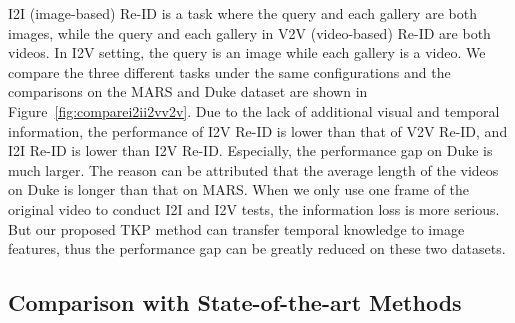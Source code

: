 \documentclass[10pt,twocolumn,letterpaper]{article}
\begin{document}
\begin{table}
	\caption{Comparison with state-of-the-art V2V Re-ID methods on the MARS dataset.}
	\vspace{-20pt}
	\small
	\begin{center}
	\end{center}
	\vspace{-20pt}
	\label{tab:sotav2vonMARS}
\end{table}

I2I (image-based) Re-ID is a task where the query and each gallery are both images, while the query and each gallery in V2V (video-based) Re-ID are both videos. In I2V setting, the query is an image while each gallery is a video.
We compare the three different tasks under the same configurations and the comparisons on the MARS and Duke dataset are shown in Figure~\ref{fig:comparei2ii2vv2v}.
Due to the lack of additional visual and temporal information, the performance of I2V Re-ID is lower than that of V2V Re-ID, and I2I Re-ID is lower than I2V Re-ID.
Especially, the performance gap on Duke is much larger.
The reason can be attributed that the average length of the videos on Duke is longer than that on MARS.
When we only use one frame of the original video to conduct I2I and I2V tests, the information loss is more serious.
But our proposed TKP method can transfer temporal knowledge to image features, thus the performance gap can be greatly reduced on these two datasets.

\subsection{Comparison with State-of-the-art Methods}
\end{document}
